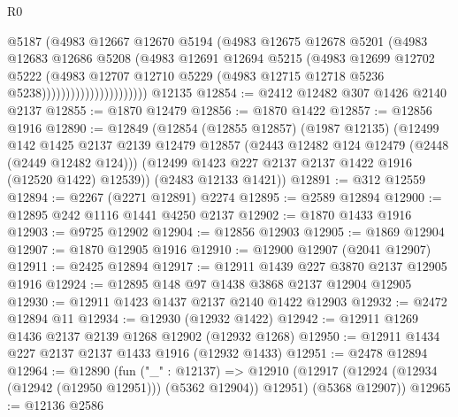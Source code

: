 \begin{lexlean}{R0}
\begin{coremodule}
                                  @5187
                                  (@4983
                                    @12667
                                    @12670
                                    @5194
                                    (@4983
                                      @12675
                                      @12678
                                      @5201
                                      (@4983
                                        @12683
                                        @12686
                                        @5208
                                        (@4983
                                          @12691
                                          @12694
                                          @5215
                                          (@4983
                                            @12699
                                            @12702
                                            @5222
                                            (@4983
                                              @12707
                                              @12710
                                              @5229
                                              (@4983 @12715 @12718 @5236 @5238))))))))))))))))))))))
    @12135
@12854 := @2412 @12482 @307 @1426 @2140 @2137
@12855 := @1870 @12479
@12856 := @1870 @1422
@12857 := @12856 @1916
@12890 := @12849
    (@12854
      (@12855 @12857)
      (@1987 @12135)
      (@12499
        @142
        @1425
        @2137
        @2139
        @12479
        @12857
        (@2443 @12482 @124 @12479 (@2448 (@2449 @12482 @124)))
        (@12499 @1423 @227 @2137 @2137 @1422 @1916 (@12520 @1422) @12539))
      (@2483 @12133 @1421))
@12891 := @312 @12559
@12894 := @2267 (@2271 @12891) @2274
@12895 := @2589 @12894
@12900 := @12895 @242 @1116 @1441 @4250 @2137
@12902 := @1870 @1433 @1916
@12903 := @9725 @12902
@12904 := @12856 @12903
@12905 := @1869 @12904
@12907 := @1870 @12905 @1916
@12910 := @12900 @12907 (@2041 @12907)
@12911 := @2425 @12894
@12917 := @12911 @1439 @227 @3870 @2137 @12905 @1916
@12924 := @12895 @148 @97 @1438 @3868 @2137 @12904 @12905
@12930 := @12911 @1423 @1437 @2137 @2140 @1422 @12903
@12932 := @2472 @12894 @11
@12934 := @12930 (@12932 @1422)
@12942 := @12911 @1269 @1436 @2137 @2139 @1268 @12902 (@12932 @1268)
@12950 := @12911 @1434 @227 @2137 @2137 @1433 @1916 (@12932 @1433)
@12951 := @2478 @12894
@12964 := @12890
    (fun ("_" : @12137) =>
    @12910 (@12917 (@12924 (@12934 (@12942 (@12950 @12951))) (@5362 @12904)) @12951) (@5368 @12907))
@12965 := @12136 @2586

\end{coremodule}
\end{lexlean}
